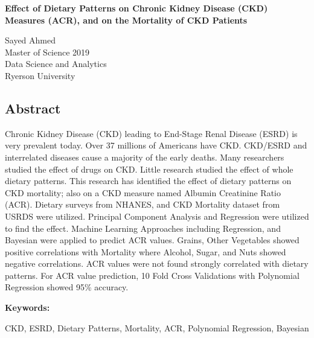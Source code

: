 \begin{center} 
\textbf{Effect of Dietary Patterns on Chronic Kidney Disease (CKD) Measures (ACR), and on the Mortality of CKD Patients} 

Sayed Ahmed \\
Master of Science 2019 \\
Data Science and Analytics \\
Ryerson University \\

\end{center}
\begin{center} \section*{Abstract} \end{center}
Chronic Kidney Disease (CKD) leading to End-Stage Renal Disease (ESRD) is very prevalent today. Over 37 millions of Americans have CKD. CKD/ESRD and interrelated diseases cause a majority of the early deaths.  Many researchers studied the effect of drugs on CKD. Little research studied the effect of  whole dietary patterns. This research has identified the effect of dietary patterns on CKD mortality; also on a CKD measure named Albumin Creatinine Ratio (ACR). Dietary surveys from NHANES, and CKD Mortality dataset from USRDS were utilized. Principal Component Analysis and Regression were utilized to find the effect. Machine Learning Approaches including Regression, and Bayesian were applied to predict ACR values. Grains, Other Vegetables showed positive correlations with Mortality where Alcohol, Sugar, and Nuts showed negative correlations. ACR values were not found strongly correlated with dietary patterns. For ACR value prediction, 10 Fold Cross Validations with Polynomial Regression showed 95\% accuracy.

\medskip
\noindent \textbf{Keywords:} 

\noindent CKD, ESRD, Dietary Patterns, Mortality, ACR, Polynomial Regression, Bayesian